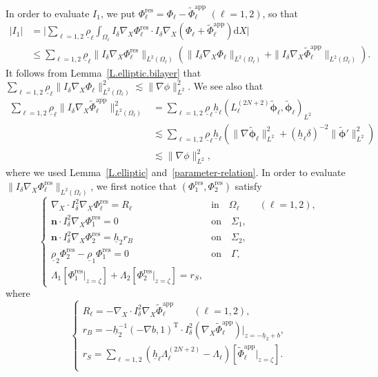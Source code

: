 \documentclass[11pt,leqno]{article}
\numberwithin{equation}{section}
\numberwithin{figure}{section}
\begin{document}
In order to evaluate $I_1$, we put $\Phi_\ell^\mathrm{res}=\Phi_\ell-\tilde{\Phi}_\ell^\mathrm{app}$ $(\ell=1,2)$, so that 
%
\begin{align*}
|I_1|
&= \biggl| \sum_{\ell=1,2}\underline{\rho}_\ell\int_{\Omega_\ell}
 I_\delta\nabla_X\Phi_\ell^\mathrm{res}\cdot I_\delta\nabla_X(\Phi_\ell+\tilde{\Phi}_\ell^\mathrm{app})\mathrm{d}X \biggr| \\
&\leq \sum_{\ell=1,2}\underline{\rho}_\ell \|I_\delta\nabla_X\Phi_\ell^\mathrm{res}\|_{L^2(\Omega_\ell)}
 ( \|I_\delta\nabla_X\Phi_\ell\|_{L^2(\Omega_\ell)} + \|I_\delta\nabla_X\tilde{\Phi}_\ell^\mathrm{app}\|_{L^2(\Omega_\ell)} ).
\end{align*}
%
It follows from Lemma~\ref{L.elliptic.bilayer} that 
$\sum_{\ell=1,2}\underline{\rho}_\ell\|I_\delta\nabla_X\Phi_\ell\|_{L^2(\Omega_\ell)}^2 \lesssim \|\nabla\phi\|_{L^2}^2$. 
We see also that 
%
\begin{align*}
\sum_{\ell=1,2}\underline{\rho}_\ell \|I_\delta\nabla_X\tilde{\Phi}_\ell^\mathrm{app}\|_{L^2(\Omega_\ell)}^2
&= \sum_{\ell=1,2}\underline{\rho}_\ell\underline{h}_\ell(L_\ell^{(2N+2)}\tilde{\bm{\phi}}_\ell, \tilde{\bm{\phi}}_\ell)_{L^2} \\
&\lesssim \sum_{\ell=1,2}\underline{\rho}_\ell\underline{h}_\ell
 ( \|\nabla\tilde{\bm{\phi}}_\ell\|_{L^2}^2+(\underline{h}_\ell\delta)^{-2}\|\tilde{\bm{\phi}}'\|_{L^2}^2 ) \\
&\lesssim \|\nabla\phi\|_{L^2}^2,
\end{align*}
%
where we used Lemma~\ref{L.elliptic} and~\eqref{parameter-relation}. 
In order to evaluate $\|I_\delta\nabla_X\Phi_\ell^\mathrm{res}\|_{L^2(\Omega_\ell)}$, we first notice that 
$(\Phi_1^\mathrm{res},\Phi_2^\mathrm{res})$ satisfy 
%
\[
\begin{cases}
 \nabla_X\cdot I_\delta^2\nabla_X\Phi_\ell^\mathrm{res} = R_\ell & \mbox{in}\quad \Omega_\ell \qquad (\ell=1,2), \\
 \bm{n}\cdot I_\delta^2\nabla_X\Phi_1^\mathrm{res} = 0 & \mbox{on}\quad \Sigma_1, \\
 \bm{n}\cdot I_\delta^2\nabla_X\Phi_2^\mathrm{res} = \underline{h}_2 r_B & \mbox{on}\quad \Sigma_2, \\
 \underline{\rho}_2\Phi_2^\mathrm{res} - \underline{\rho}_1\Phi_1^\mathrm{res} = 0 &\mbox{on}\quad \Gamma, \\
 \Lambda_1[\Phi_1^\mathrm{res}|_{z=\zeta}] + \Lambda_2[\Phi_2^\mathrm{res}|_{z=\zeta}] = r_S,
\end{cases}
\]
%
where 
%
\[
\begin{cases}
 R_\ell = -\nabla_X\cdot I_\delta^2\nabla_X\tilde{\Phi}_\ell^\mathrm{app} \qquad (\ell=1,2), \\
 r_B = -\underline{h}_2^{-1}(-\nabla b, 1)^\mathrm{T}\cdot I_\delta^2(\nabla_X\tilde{\Phi}_\ell^\mathrm{app})|_{z=-\underline{h}_2+b}, \\
 \displaystyle
 r_S = \sum_{\ell=1,2}(\underline{h}_\ell\Lambda_\ell^{(2N+2)}-\Lambda_\ell)[\tilde{\Phi}_\ell^\mathrm{app}|_{z=\zeta}].\\
\end{cases}
\]
\end{document}
